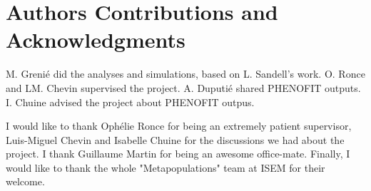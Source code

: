 \label{sec:Ack}
\section*{Authors Contributions and Acknowledgments}

M. Grenié did the analyses and simulations, based on L. Sandell's work. O. Ronce and LM. Chevin supervised the project. A. Duputié shared \textsc{PHENOFIT} outputs. I. Chuine advised the project about \textsc{PHENOFIT} outpus.

I would like to thank Ophélie Ronce for being an extremely patient supervisor, Luis-Miguel Chevin and Isabelle Chuine for the discussions we had about the project. I thank Guillaume Martin for being an awesome office-mate. Finally, I would like to thank the whole "Metapopulations" team at ISEM for their welcome.